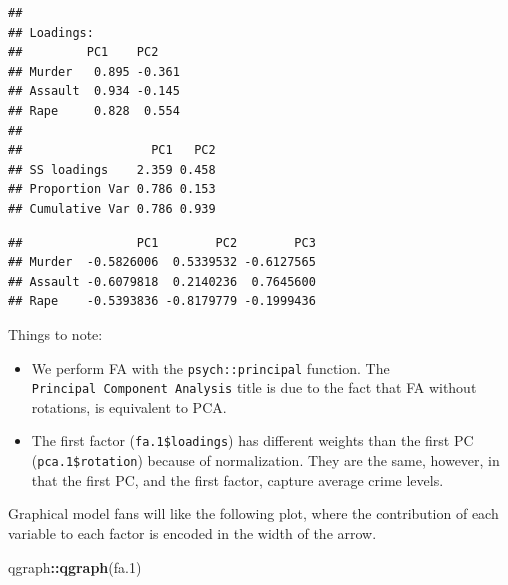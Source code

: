 \documentclass[]{book}
\newenvironment{Shaded}{\begin{snugshade}}{\end{snugshade}}
\newcommand{\KeywordTok}[1]{\textcolor[rgb]{0.13,0.29,0.53}{\textbf{#1}}}
\newcommand{\DecValTok}[1]{\textcolor[rgb]{0.00,0.00,0.81}{#1}}
\newcommand{\CommentTok}[1]{\textcolor[rgb]{0.56,0.35,0.01}{\textit{#1}}}
\newcommand{\OperatorTok}[1]{\textcolor[rgb]{0.81,0.36,0.00}{\textbf{#1}}}
\newcommand{\NormalTok}[1]{#1}
\providecommand{\tightlist}{%
  \setlength{\itemsep}{0pt}\setlength{\parskip}{0pt}}
\theoremstyle{definition}
\theoremstyle{definition}
\theoremstyle{definition}
\theoremstyle{remark}
\begin{document}
\begin{Shaded}
\end{Shaded}

\begin{verbatim}
## 
## Loadings:
##         PC1    PC2   
## Murder   0.895 -0.361
## Assault  0.934 -0.145
## Rape     0.828  0.554
## 
##                  PC1   PC2
## SS loadings    2.359 0.458
## Proportion Var 0.786 0.153
## Cumulative Var 0.786 0.939
\end{verbatim}

\begin{Shaded}
\end{Shaded}

\begin{verbatim}
##                PC1        PC2        PC3
## Murder  -0.5826006  0.5339532 -0.6127565
## Assault -0.6079818  0.2140236  0.7645600
## Rape    -0.5393836 -0.8179779 -0.1999436
\end{verbatim}

Things to note:

\begin{itemize}
\tightlist
\item
  We perform FA with the \texttt{psych::principal} function. The
  \texttt{Principal\ Component\ Analysis} title is due to the fact that
  FA without rotations, is equivalent to PCA.
\item
  The first factor (\texttt{fa.1\$loadings}) has different weights than
  the first PC (\texttt{pca.1\$rotation}) because of normalization. They
  are the same, however, in that the first PC, and the first factor,
  capture average crime levels.
\end{itemize}

Graphical model fans will like the following plot, where the
contribution of each variable to each factor is encoded in the width of
the arrow.

\begin{Shaded}
\begin{Highlighting}[]
\NormalTok{qgraph}\OperatorTok{::}\KeywordTok{qgraph}\NormalTok{(fa.}\DecValTok{1}\NormalTok{)}
\end{Highlighting}
\end{Shaded}
\end{document}
